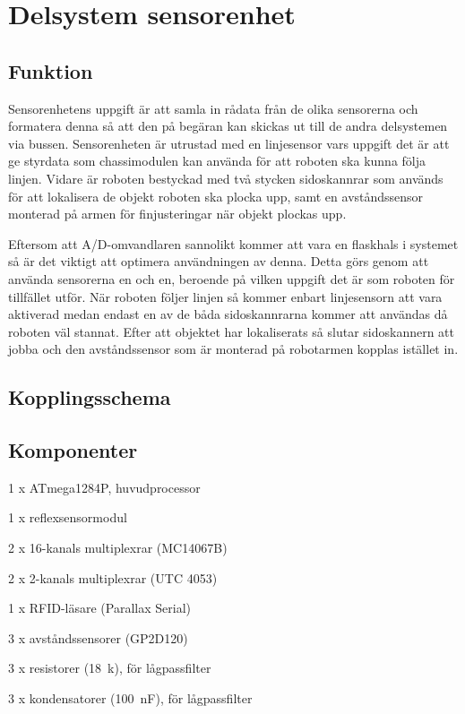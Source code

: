 

\section{Delsystem sensorenhet}


\subsection{Funktion}

Sensorenhetens uppgift är att samla in rådata från de olika sensorerna och formatera denna så att den på begäran kan skickas ut till de andra delsystemen via bussen. Sensorenheten är utrustad med en linjesensor vars uppgift det är att ge styrdata som chassimodulen kan använda för att roboten ska kunna följa linjen. Vidare är roboten bestyckad med två stycken sidoskannrar som används för att lokalisera de objekt roboten ska plocka upp, samt en avståndssensor monterad på armen för finjusteringar när objekt plockas upp.

Eftersom att A/D-omvandlaren sannolikt kommer att vara en flaskhals i systemet så är det viktigt att optimera användningen av denna. Detta görs genom att använda sensorerna en och en, beroende på vilken uppgift det är som roboten för tillfället utför. När roboten följer linjen så kommer enbart linjesensorn att vara aktiverad medan endast en av de båda sidoskannrarna kommer att användas då roboten väl stannat. Efter att objektet har lokaliserats så slutar sidoskannern att jobba och den avståndssensor som är monterad på robotarmen kopplas istället in.


\subsection{Kopplingsschema}




\subsection{Komponenter}

\begin{packed_itemize}
\item 1 x ATmega1284P, huvudprocessor
\item 1 x reflexsensormodul
\item 2 x 16-kanals multiplexrar (MC14067B)
\item 2 x 2-kanals multiplexrar (UTC 4053)
\item 1 x RFID-läsare (Parallax Serial)
\item 3 x avståndssensorer (GP2D120)
\item 3 x resistorer (18~k\ohm), för lågpassfilter
\item 3 x kondensatorer (100~nF), för lågpassfilter
\end{packed_itemize}


